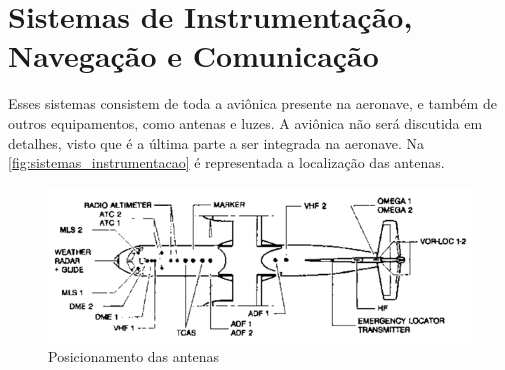 \section{Sistemas de Instrumentação, Navegação e Comunicação}

Esses sistemas consistem de toda a aviônica presente na aeronave, e também de outros equipamentos, como antenas e luzes.
A aviônica não será discutida em detalhes, visto que é a última parte a ser integrada na aeronave.
Na \autoref{fig:sistemas_instrumentacao} é representada a localização das antenas.

\begin{figure}
\centering
\includegraphics[width=\textwidth]{images/parte3/sistemas_instrumentacao.png}
\caption{Posicionamento das antenas}
\label{fig:sistemas_instrumentacao}
\end{figure}
